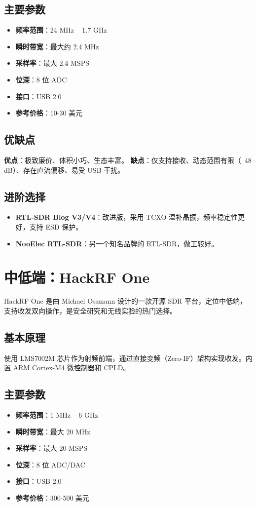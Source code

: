 \documentclass[12pt,UTF8]{ctexbook}
\begin{document}
\subsection{主要参数}
\begin{itemize}[leftmargin=2cm]
    \item \textbf{频率范围}：24 MHz ~ 1.7 GHz
    \item \textbf{瞬时带宽}：最大约 2.4 MHz
    \item \textbf{采样率}：最大 2.4 MSPS
    \item \textbf{位深}：8 位 ADC
    \item \textbf{接口}：USB 2.0
    \item \textbf{参考价格}：10-30 美元
\end{itemize}

\subsection{优缺点}
\textbf{优点}：极致廉价、体积小巧、生态丰富。
\textbf{缺点}：仅支持接收、动态范围有限（~48 dB）、存在直流偏移、易受 USB 干扰。

\subsection{进阶选择}
\begin{itemize}[leftmargin=2cm]
    \item \textbf{RTL-SDR Blog V3/V4}：改进版，采用 TCXO 温补晶振，频率稳定性更好，支持 ESD 保护。
    \item \textbf{NooElec RTL-SDR}：另一个知名品牌的 RTL-SDR，做工较好。
\end{itemize}

\section{中低端：HackRF One}
\label{sec:hackrf_one}

HackRF One 是由 Michael Ossmann 设计的一款开源 SDR 平台，定位中低端，支持收发双向操作，是安全研究和无线实验的热门选择。

\subsection{基本原理}
使用 LMS7002M 芯片作为射频前端，通过直接变频（Zero-IF）架构实现收发。内置 ARM Cortex-M4 微控制器和 CPLD。

\subsection{主要参数}
\begin{itemize}[leftmargin=2cm]
    \item \textbf{频率范围}：1 MHz ~ 6 GHz
    \item \textbf{瞬时带宽}：最大 20 MHz
    \item \textbf{采样率}：最大 20 MSPS
    \item \textbf{位深}：8 位 ADC/DAC
    \item \textbf{接口}：USB 2.0
    \item \textbf{参考价格}：300-500 美元
\end{itemize}
\end{document}
